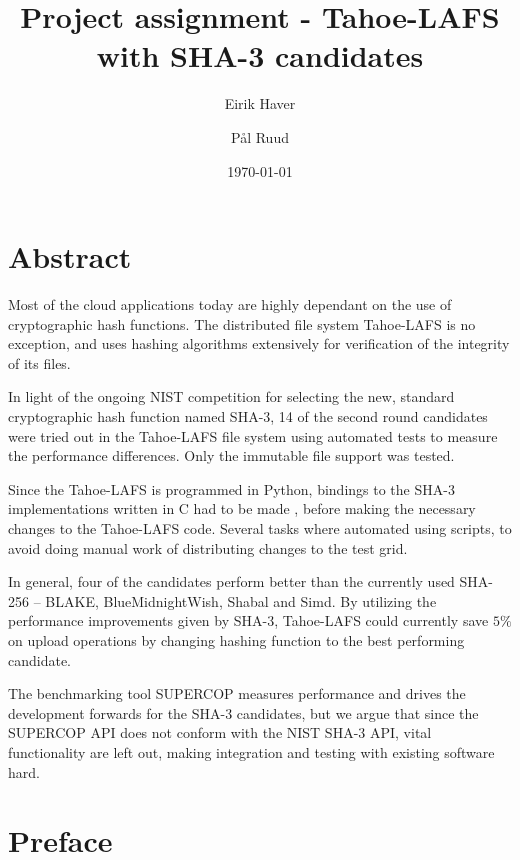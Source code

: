 \documentclass[english,12pt,a4paper]{book}
\author{Eirik Haver \and Pål Ruud}
\title{Project assignment - Tahoe-LAFS with SHA-3 candidates}
\date{\today}
\begin{document}

\pagestyle{empty}

\chapter*{Abstract}
\pagestyle{plain}
\setcounter{page}{1}

%

Most of the cloud applications today are highly dependant on the use of
cryptographic hash functions. The distributed file system Tahoe-LAFS is no
exception, and uses hashing algorithms extensively for verification of the
integrity of its files.

In light of the ongoing NIST competition for selecting the new, standard
cryptographic hash function named SHA-3, 14 of the second round candidates were
tried out in the Tahoe-LAFS file system using automated tests to measure the
performance differences. Only the immutable file support was tested.

Since the Tahoe-LAFS is programmed in Python, bindings to the SHA-3
implementations written in C had to be made , before making the necessary
changes to the Tahoe-LAFS code. Several tasks where automated using scripts, to
avoid doing manual work of distributing changes to the test grid.

In general, four of the candidates perform better than the currently used
SHA-256 -- BLAKE, BlueMidnightWish, Shabal and Simd.  By utilizing the
performance improvements given by SHA-3, Tahoe-LAFS could currently save $5\%$
on upload operations by changing hashing function to the best performing
candidate.

The benchmarking tool SUPERCOP measures performance and drives the development
forwards for the SHA-3 candidates, but we argue that since the SUPERCOP API does
not conform with the NIST SHA-3 API, vital functionality are left out, making
integration and testing with existing software hard.

\chapter*{Preface}
\end{document}
